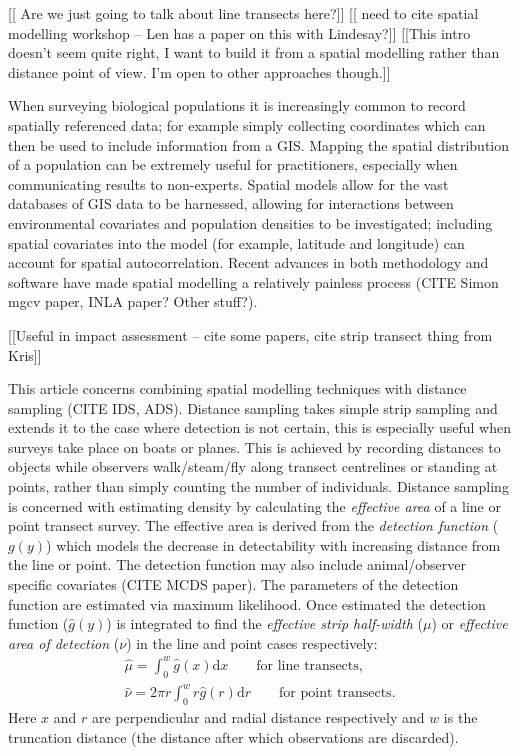 \documentclass[useAMS,referee]{biom}
\begin{document}
[[ Are we just going to talk about line transects here?]]
[[ need to cite spatial modelling workshop -- Len has a paper on this with Lindesay?]]
[[This intro doesn't seem quite right, I want to build it from a spatial modelling rather than distance point of view. I'm open to other approaches though.]]

When surveying biological populations it is increasingly common to record spatially referenced data; for example simply collecting coordinates which can then be used to include information from a GIS. Mapping the spatial distribution of a population can be extremely useful for practitioners, especially when communicating results to non-experts. Spatial models allow for the vast databases of GIS data to be harnessed, allowing for interactions between environmental covariates and population densities to be investigated; including spatial covariates into the model (for example, latitude and longitude) can account for spatial autocorrelation. Recent advances in both methodology and software have made spatial modelling a relatively painless process (CITE Simon mgcv paper, INLA paper? Other stuff?).

[[Useful in impact assessment -- cite some papers, cite strip transect thing from Kris]]

This article concerns combining spatial modelling techniques with distance sampling (CITE IDS, ADS). Distance sampling takes simple strip sampling and extends it to the case where detection is not certain, this is especially useful when surveys take place on boats or planes. This is achieved by recording distances to objects while observers walk/steam/fly along transect centrelines or standing at points, rather than simply counting the number of individuals. Distance sampling is concerned with estimating density by calculating the \textit{effective area} of a line or point transect survey. The effective area is derived from the \textit{detection function} ($g(y)$) which models the decrease in detectability with increasing distance from the line or point. The detection function may also include animal/observer specific covariates (CITE MCDS paper). The parameters of the detection function are estimated via maximum likelihood. Once estimated the detection function ($\hat{g}(y)$) is integrated to find the \textit{effective strip half-width} ($\mu$) or \textit{effective area of detection} ($\nu$) in the line and point cases respectively:
\begin{eqnarray*}
\hat{\mu} = \int_0^w \hat{g}(x) \text{d}x \qquad \text{for line transects},\\
\hat{\nu} = 2\pi r \int_0^w r \hat{g}(r) \text{d}r \qquad \text{for point transects}.
\end{eqnarray*}
Here $x$ and $r$ are perpendicular and radial distance respectively and $w$ is the truncation distance (the distance after which observations are discarded).
\end{document}
